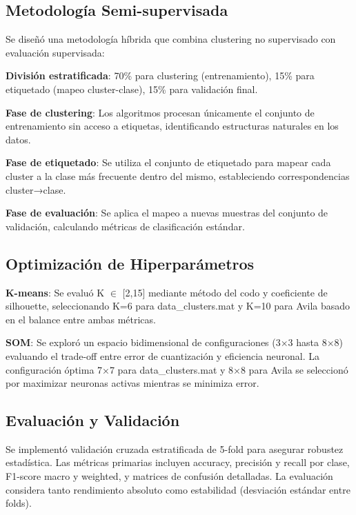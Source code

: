 \documentclass[12pt,a4paper]{article}
\begin{document}
\subsection{Metodología Semi-supervisada}

Se diseñó una metodología híbrida que combina clustering no supervisado con evaluación supervisada:

\textbf{División estratificada}: 70\% para clustering (entrenamiento), 15\% para etiquetado (mapeo cluster-clase), 15\% para validación final.

\textbf{Fase de clustering}: Los algoritmos procesan únicamente el conjunto de entrenamiento sin acceso a etiquetas, identificando estructuras naturales en los datos.

\textbf{Fase de etiquetado}: Se utiliza el conjunto de etiquetado para mapear cada cluster a la clase más frecuente dentro del mismo, estableciendo correspondencias cluster→clase.

\textbf{Fase de evaluación}: Se aplica el mapeo a nuevas muestras del conjunto de validación, calculando métricas de clasificación estándar.

\subsection{Optimización de Hiperparámetros}

\textbf{K-means}: Se evaluó K $\in$ [2,15] mediante método del codo y coeficiente de silhouette, seleccionando K=6 para data\_clusters.mat y K=10 para Avila basado en el balance entre ambas métricas.

\textbf{SOM}: Se exploró un espacio bidimensional de configuraciones (3×3 hasta 8×8) evaluando el trade-off entre error de cuantización y eficiencia neuronal. La configuración óptima 7×7 para data\_clusters.mat y 8×8 para Avila se seleccionó por maximizar neuronas activas mientras se minimiza error.

\subsection{Evaluación y Validación}

Se implementó validación cruzada estratificada de 5-fold para asegurar robustez estadística. Las métricas primarias incluyen accuracy, precisión y recall por clase, F1-score macro y weighted, y matrices de confusión detalladas. La evaluación considera tanto rendimiento absoluto como estabilidad (desviación estándar entre folds).
\end{document}
